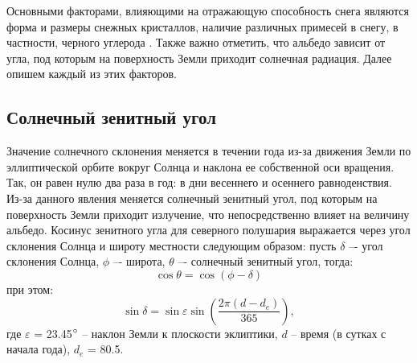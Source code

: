\documentclass[a4paper, fontsize=14pt]{scrartcl}
\begin{document}
Основными факторами, влияющими на отражающую способность снега являются форма и размеры снежных кристаллов, наличие различных примесей в снегу, в частности, черного углерода \cite{Bak2019}. Также важно отметить, что альбедо зависит от угла, под которым на поверхность Земли приходит солнечная радиация. Далее опишем каждый из этих факторов.


\subsection{Солнечный зенитный угол}

Значение солнечного склонения меняется в течении года из-за движения Земли по эллиптической орбите вокруг Солнца и наклона ее собственной оси вращения. Так, он равен нулю два раза в год: в дни весеннего и осеннего равноденствия. Из-за данного явления меняется солнечный зенитный угол, под которым на поверхность Земли приходит излучение, что непосредственно влияет на величину альбедо. Косинус зенитного угла для северного полушария выражается через угол склонения Солнца и широту местности следующим образом: пусть $\delta$ –- угол склонения Солнца, $\phi$ –- широта, $\theta$ –- солнечный зенитный угол, тогда:
\begin{equation}
    \cos \theta = \cos ( \phi - \delta ) \label{sys}
\end{equation}
при этом:
\begin{equation}
    \sin \delta = \sin \varepsilon \sin \left(\dfrac{2 \pi (d - d_e)}{365} \right) ,  \label{sys}
\end{equation}
где $\varepsilon$ = 23.45$\degree$  – наклон Земли к плоскости эклиптики, $d$ – время (в сутках с начала года), $d_e$ = 80.5.
\end{document}
